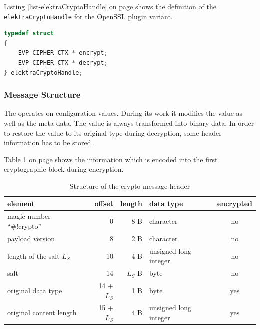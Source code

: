 Listing \ref{list-elektraCryptoHandle} on page \pageref{list-elektraCryptoHandle} shows the definition of the \texttt{elektraCryptoHandle} for the OpenSSL plugin variant.

\begin{lstlisting}[label=list-elektraCryptoHandle,language=C,caption={Definiton of elektraCryptoHandle for the OpenSSL crypto plugin variant}]
typedef struct
{
	EVP_CIPHER_CTX * encrypt;
	EVP_CIPHER_CTX * decrypt;
} elektraCryptoHandle;
\end{lstlisting}


\subsubsection{Message Structure}

The \crypto{} operates on configuration values.
During its work it modifies the value as well as the meta-data.
The value is always transformed into binary data.
In order to restore the value to its original type during decryption, some header information has to be stored.

Table \ref{impl-msgheader} on page \pageref{impl-msgheader} shows the information which is encoded into the first cryptographic block during encryption.

\begin{table}[h]
\centering
\caption{Structure of the crypto message header}
\label{impl-msgheader}
\begin{tabular}{lrrlc}
	\textbf{element}           & \textbf{offset} & \textbf{length} & \textbf{data type}    & \textbf{encrypted} \\ \hline
	magic number ``\#!crypto'' & 0               & 8 B             & character             & no                 \\
	payload version            & 8               & 2 B             & character             & no                 \\
	length of the salt $L_S$   & 10              & 4 B             & unsigned long integer & no                 \\
	salt                       & 14              & $L_S$ B         & byte                  & no                 \\
	original data type         & 14 + $L_S$      & 1 B             & byte                  & yes                \\
	original content length    & 15 + $L_S$      & 4 B             & unsigned long integer & yes                \\ \hline
\end{tabular}
\end{table}

